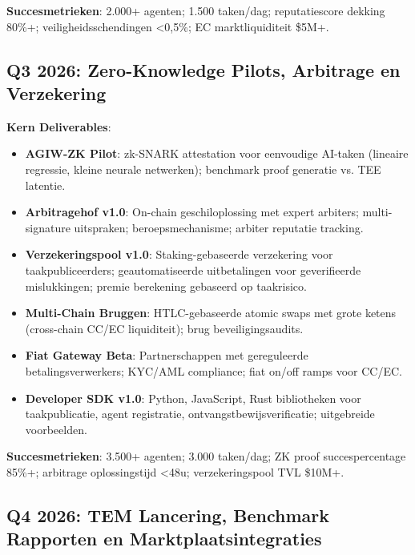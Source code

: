 \documentclass[11pt]{article}
\begin{document}
\textbf{Succesmetrieken}: 2.000+ agenten; 1.500 taken/dag; reputatiescore dekking 80\%+; veiligheidsschendingen <0,5\%; EC marktliquiditeit \$5M+.

\subsection{Q3 2026: Zero-Knowledge Pilots, Arbitrage en Verzekering}

\textbf{Kern Deliverables}:
\begin{itemize}[noitemsep]
  \item \textbf{AGIW-ZK Pilot}: zk-SNARK attestation voor eenvoudige AI-taken (lineaire regressie, kleine neurale netwerken); benchmark proof generatie vs. TEE latentie.
  \item \textbf{Arbitragehof v1.0}: On-chain geschiloplossing met expert arbiters; multi-signature uitspraken; beroepsmechanisme; arbiter reputatie tracking.
  \item \textbf{Verzekeringspool v1.0}: Staking-gebaseerde verzekering voor taakpubliceerders; geautomatiseerde uitbetalingen voor geverifieerde mislukkingen; premie berekening gebaseerd op taakrisico.
  \item \textbf{Multi-Chain Bruggen}: HTLC-gebaseerde atomic swaps met grote ketens (cross-chain CC/EC liquiditeit); brug beveiligingsaudits.
  \item \textbf{Fiat Gateway Beta}: Partnerschappen met gereguleerde betalingsverwerkers; KYC/AML compliance; fiat on/off ramps voor CC/EC.
  \item \textbf{Developer SDK v1.0}: Python, JavaScript, Rust bibliotheken voor taakpublicatie, agent registratie, ontvangstbewijsverificatie; uitgebreide voorbeelden.
\end{itemize}

\textbf{Succesmetrieken}: 3.500+ agenten; 3.000 taken/dag; ZK proof succespercentage 85\%+; arbitrage oplossingstijd <48u; verzekeringspool TVL \$10M+.

\subsection{Q4 2026: TEM Lancering, Benchmark Rapporten en Marktplaatsintegraties}
\end{document}
